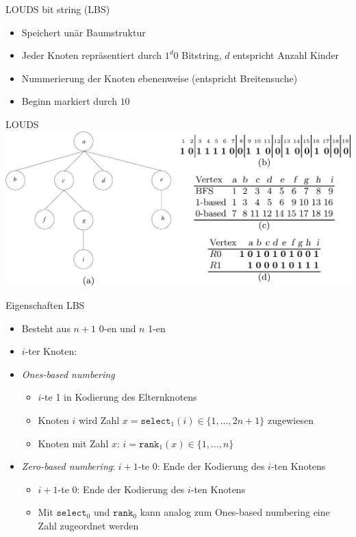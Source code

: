 \documentclass[ngerman,aspectratio=169,10pt]{beamer}
\begin{document}
\begin{frame}{LOUDS bit string (LBS)}
    \begin{itemize}
        \item Speichert unär Baumstruktur
        \item Jeder Knoten repräsentiert durch $1^d0$ Bitstring, $d$ entspricht Anzahl Kinder
        \item Nummerierung der Knoten ebenenweise (entspricht Breitensuche)
        \item Beginn markiert durch $10$
    \end{itemize}
\end{frame}

\begin{frame}{LOUDS}
    \includegraphics[width=1.0\textwidth]{LOUDS.jpg}
\end{frame}

\begin{frame}{Eigenschaften LBS}
    \begin{itemize}
        \item Besteht aus $n+1$ 0-en und $n$ 1-en
        \item $i$-ter Knoten:
        \item \textit{Ones-based numbering}
        \begin{itemize}
            \item $i$-te 1 in Kodierung des Elternknotens
            \item Knoten $i$ wird Zahl $x=\texttt{select}_1(i)\in\{1,\ldots,2n+1\}$ zugewiesen
            \item Knoten mit Zahl $x$: $i=\texttt{rank}_1(x)\in\{1,\ldots,n\}$
        \end{itemize}
        \item \textit{Zero-based numbering}: $i+1$-te 0: Ende der Kodierung des $i$-ten Knotens
        \begin{itemize}
            \item $i+1$-te 0: Ende der Kodierung des $i$-ten Knotens
            \item Mit $\texttt{select}_0$ und $\texttt{rank}_0$ kann analog zum Ones-based numbering eine Zahl zugeordnet werden
        \end{itemize}
    \end{itemize} 
\end{frame}
\end{document}
